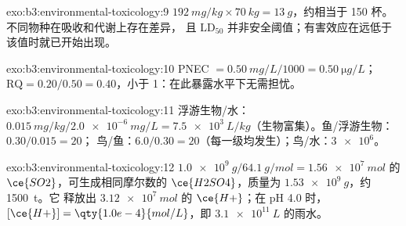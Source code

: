 \begin{solution}{exo:b3:environmental-toxicology:9}
$\qty{192}{mg/kg} \times \qty{70}{kg} = \qty{13}{g}$，约相当于 150 杯。不同物种在吸收和代谢上存在差异，
且 $\mathrm{LD_{50}}$ 并非安全阈值；有害效应在远低于该值时就已开始出现。
\end{solution}

\begin{solution}{exo:b3:environmental-toxicology:10}
PNEC $= \qty{0.50}{mg/L}/1000 = \qty{0.50}{\micro g/L}$；$\mathrm{RQ} = 0.20/0.50 = 0.40$，小于 1：在此暴露水平下无需担忧。
\end{solution}

\begin{solution}{exo:b3:environmental-toxicology:11}
浮游生物/水：$\qty{0.015}{mg/kg}/\qty{2.0e-6}{mg/L} = \qty{7.5e3}{L/kg}$（生物富集）。鱼/浮游生物：$0.30/0.015 = 20$；
鸟/鱼：$6.0/0.30 = 20$（每一级均发生）；鸟/水：$\num{3e6}$。
\end{solution}

\begin{solution}{exo:b3:environmental-toxicology:12}
$\qty{1.0e9}{g}/\qty{64.1}{g/mol} = \qty{1.56e7}{mol}$ 的 $\ce{SO2}$，可生成相同摩尔数的 $\ce{H2SO4}$，质量为 $\qty{1.53e9}{g}$，约 \qty{1500}{t}。它
释放出 $\qty{3.12e7}{mol}$ 的 $\ce{H+}$；在 pH 4.0 时，$[\ce{H+}] = \qty{1.0e-4}{mol/L}$，即 $\qty{3.1e11}{L}$ 的雨水。
\end{solution}

